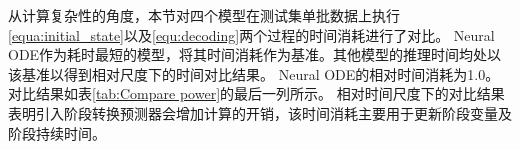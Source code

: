 从计算复杂性的角度，本节对四个模型在测试集单批数据上执行\eqref{equa:initial_state}以及\eqref{equ:decoding}两个过程的时间消耗进行了对比。
Neural ODE作为耗时最短的模型，将其时间消耗作为基准。其他模型的推理时间均处以该基准以得到相对尺度下的时间对比结果。
Neural ODE的相对时间消耗为1.0。对比结果如表\ref{tab:Compare power}的最后一列所示。
相对时间尺度下的对比结果表明引入阶段转换预测器会增加计算的开销，该时间消耗主要用于更新阶段变量及阶段持续时间。

